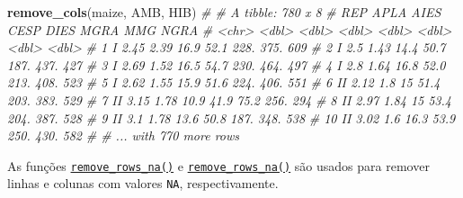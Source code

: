 \documentclass[
]{book}
\newenvironment{Shaded}{\begin{snugshade}}{\end{snugshade}}
\newcommand{\CommentTok}[1]{\textcolor[rgb]{0.56,0.35,0.01}{\textit{#1}}}
\newcommand{\KeywordTok}[1]{\textcolor[rgb]{0.13,0.29,0.53}{\textbf{#1}}}
\newcommand{\NormalTok}[1]{#1}
\begin{document}
\begin{Shaded}
\begin{Highlighting}[]
\KeywordTok{remove_cols}\NormalTok{(maize, AMB, HIB)}
\CommentTok{# # A tibble: 780 x 8}
\CommentTok{#    REP    APLA  AIES  CESP  DIES  MGRA   MMG  NGRA}
\CommentTok{#    <chr> <dbl> <dbl> <dbl> <dbl> <dbl> <dbl> <dbl>}
\CommentTok{#  1 I      2.45  2.39  16.9  52.1 228.   375.   609}
\CommentTok{#  2 I      2.5   1.43  14.4  50.7 187.   437.   427}
\CommentTok{#  3 I      2.69  1.52  16.5  54.7 230.   464.   497}
\CommentTok{#  4 I      2.8   1.64  16.8  52.0 213.   408.   523}
\CommentTok{#  5 I      2.62  1.55  15.9  51.6 224.   406.   551}
\CommentTok{#  6 II     2.12  1.8   15    51.4 203.   383.   529}
\CommentTok{#  7 II     3.15  1.78  10.9  41.9  75.2  256.   294}
\CommentTok{#  8 II     2.97  1.84  15    53.4 204.   387.   528}
\CommentTok{#  9 II     3.1   1.78  13.6  50.8 187.   348.   538}
\CommentTok{# 10 II     3.02  1.6   16.3  53.9 250.   430.   582}
\CommentTok{# # ... with 770 more rows}
\end{Highlighting}
\end{Shaded}

As funções \href{https://tiagoolivoto.github.io/metan/reference/utils_rows_cols.html}{\texttt{remove\_rows\_na()}} e \href{https://tiagoolivoto.github.io/metan/reference\%20/utils_rows_cols.html}{\texttt{remove\_rows\_na()}} são usados para remover linhas e colunas com valores \texttt{NA}, respectivamente. 
\end{document}
